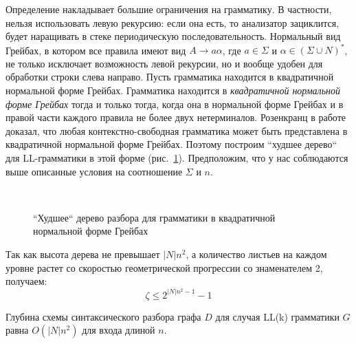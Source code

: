 Определение накладывает большие ограничения на грамматику. В частности, нельзя использовать левую рекурсию: если она есть, то анализатор зациклится, будет наращивать в стеке периодическую последовательность. Нормальный вид Грейбах, в котором все правила имеют вид $A \rightarrow a \alpha$, где $a \in \Sigma$ и $\alpha \in (\Sigma \cup N)^*$, не только исключает возможность левой рекурсии, но и вообще удобен для обработки строки слева направо. Пусть грамматика находится в квадратичной нормальной форме Грейбах. Грамматика находится в \textit{квадратичной нормальной форме Грейбах} тогда и только тогда, когда она в нормальной форме Грейбах и в правой части каждого правила не более двух нетерминалов. Розенкранц в работе~\cite{QuadGreib} доказал, что любая контекстно-свободная грамматика может быть представлена в квадратичной нормальной форме Грейбах. Поэтому построим ``худшее дерево`` для LL-грамматики в этой форме (рис.~\ref{LLw}). Предположим, что у нас соблюдаются выше описанные условия на соотношение $\Sigma$ и $n$.
\begin{figure}[h!]
\centering
{}
 \\
	\caption{``Худшее`` дерево разбора для грамматики в квадратичной нормальной форме Грейбах}
\label{LLw}
\end{figure}
Так как высота дерева не превышает $|N|n^2$, а количество листьев на каждом уровне растет со скоростью геометрической прогрессии со знаменателем 2, получаем:
\begin{equation}
\zeta \le 2^{|N|n^2 - 1} - 1
\end{equation}
\begin{corollaryrus}
Глубина схемы синтаксического разбора графа $D$ для случая LL(k) грамматики $G$ равна $O(|N|n^2)$ для входа длиной $n$.
\end{corollaryrus}
